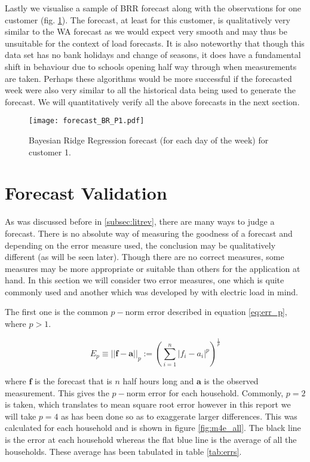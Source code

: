 Lastly we visualise a sample of BRR forecast along with the observations for one customer (fig. \ref{fig:BR_forecast_P1}). The forecast, at least for this customer, is qualitatively very similar to the WA forecast as we would expect very smooth and may thus be unsuitable for the context of load forecasts. It is also noteworthy that though this data set has no bank holidays and change of seasons, it does have a fundamental shift in behaviour due to schools opening half way through when measurements are taken. Perhaps these algorithms would be more successful if the forecasted week were also very similar to all the historical data being used to generate the forecast. We will quantitatively verify all the above forecasts in the next section.

\begin{figure}
\centering
\texttt{[image: forecast\_BR\_P1.pdf]}
\caption{Bayesian Ridge Regression forecast (for each day of the week) for customer 1.}
\label{fig:BR_forecast_P1} 
\end{figure}
\clearpage


\section{Forecast Validation} \label{subsec:errs}
As was discussed before in \ref{subsec:litrev}, there are many ways to judge a forecast. There is no absolute way of measuring the goodness of a forecast and depending on the error measure used, the conclusion may be qualitatively different (as will be seen later). Though there are no correct measures, some measures may be more appropriate or suitable than others for the application at hand. In this section we will consider two error measures, one which is quite commonly used and another which was developed by \cite{dan14} with electric load in mind.

The first one is the common $p-$norm error described in equation \ref{eq:err_p}, where $ p > 1 $.

\begin{equation}\label{eq:err_p}
E_p \equiv ||\boldsymbol{f} - \boldsymbol{a}||_p := \left( \sum_{i=1}^{n} |f_i - a_i |^p\right)^{\frac{1}{p}}
\end{equation}

where $\boldsymbol{f}$ is the forecast that is $n$ half hours long and $\boldsymbol{a}$ is the observed measurement. This gives the $p-$norm error for each household. Commonly, $p=2$ is taken, which translates to mean square root error however in this report we will take $p=4$ as has been done \citet{dan14}  so as to exaggerate larger differences. This was calculated for each household and is shown in figure \ref{fig:m4e_all}. The black line is the error at each household whereas the flat blue line is the average of all the households. These average has been tabulated in table \ref{tab:errs}.

